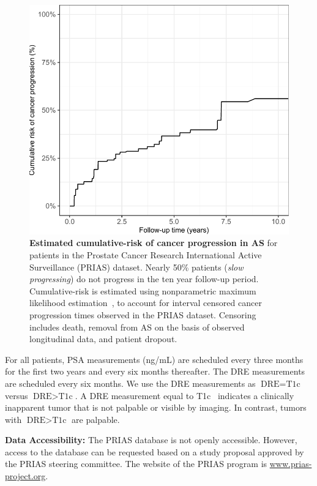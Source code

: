 \begin{figure}
\includegraphics{contents/c3/images/c3_fig2.pdf}
\caption{\textbf{Estimated cumulative-risk of cancer progression in AS} for patients in the Prostate Cancer Research International Active Surveillance (PRIAS) dataset. Nearly 50\% patients (\emph{slow progressing}) do not progress in the ten year follow-up period. Cumulative-risk is estimated using nonparametric maximum likelihood estimation~\citep{turnbull1976empirical}, to account for interval censored cancer progression times observed in the PRIAS dataset. Censoring includes death, removal from AS on the basis of observed longitudinal data, and patient dropout.}
\label{c3:fig:2}
\end{figure}

For all patients, PSA measurements (ng/mL) are scheduled every three months for the first two years and every six months thereafter. The DRE measurements are scheduled every six months. We use the DRE measurements as ${\mbox{DRE} = \mbox{T1c}}$ versus $\mbox{DRE} > \mbox{T1c}$. A DRE measurement equal to T1c~\citep{schroder1992tnm} indicates a clinically inapparent tumor that is not palpable or visible by imaging. In contrast, tumors with $\mbox{DRE} > \mbox{T1c}$ are palpable.

\textbf{Data Accessibility:} The PRIAS database is not openly accessible. However, access to the database can be requested based on a study proposal approved by the PRIAS steering committee. The website of the PRIAS program is \url{www.prias-project.org}.

